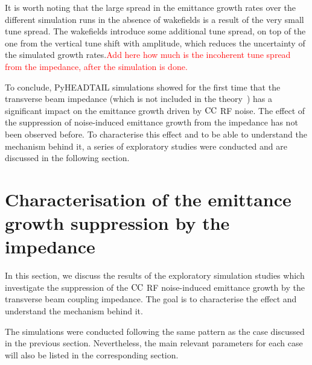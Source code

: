 It is worth noting that the large spread in the emittance growth rates over the different simulation runs in the absence of wakefields is a result of the very small tune spread. The wakefields introduce some additional tune spread, on top of the one from the vertical tune shift with amplitude, which reduces the uncertainty of the simulated growth rates.\textcolor{red}{Add here how much is the incoherent tune spread from the impedance, after the simulation is done.}

To conclude, PyHEADTAIL simulations showed for the first time that the transverse beam impedance (which is not included in the theory~\cite{PhysRevSTAB.18.101001}) has a significant impact on the emittance growth driven by ${\mathrm{CC}}$ RF noise. The effect of the suppression of noise-induced emittance growth from the impedance has not been observed before. 
To characterise this effect and to be able to understand the mechanism behind it, a series of exploratory studies were conducted and are discussed in the following section. 


\section{Characterisation of the emittance growth suppression by the impedance}\label{sec:emittance_growth_exploratory_studies}

In this section, we discuss the results of the exploratory simulation studies which investigate the suppression of the ${\mathrm{CC}}$ RF noise-induced emittance growth by the transverse beam coupling impedance. The goal is to characterise the effect and understand the mechanism behind it. 

The simulations were conducted following the same pattern as the case discussed in the previous section. Nevertheless, the main relevant parameters for each case will also be listed in the corresponding section.

